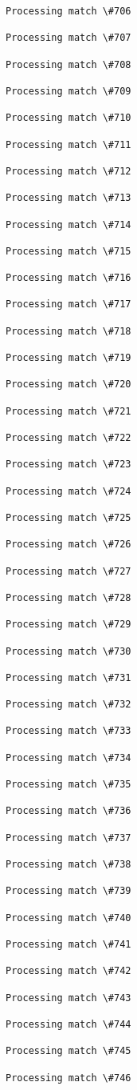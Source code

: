 \documentclass[11pt]{article}
\begin{document}
\begin{Verbatim}[commandchars=\\\{\}]
Processing match \#706

Processing match \#707

Processing match \#708

Processing match \#709

Processing match \#710

Processing match \#711

Processing match \#712

Processing match \#713

Processing match \#714

Processing match \#715

Processing match \#716

Processing match \#717

Processing match \#718

Processing match \#719

Processing match \#720

Processing match \#721

Processing match \#722

Processing match \#723

Processing match \#724

Processing match \#725

Processing match \#726

Processing match \#727

Processing match \#728

Processing match \#729

Processing match \#730

Processing match \#731

Processing match \#732

Processing match \#733

Processing match \#734

Processing match \#735

Processing match \#736

Processing match \#737

Processing match \#738

Processing match \#739

Processing match \#740

Processing match \#741

Processing match \#742

Processing match \#743

Processing match \#744

Processing match \#745

Processing match \#746


\end{Verbatim}
\end{document}
